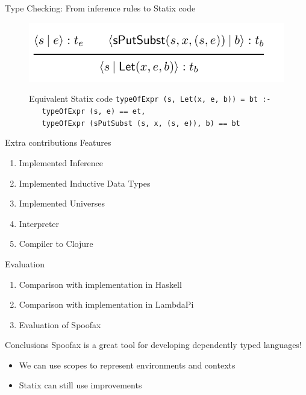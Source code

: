 \documentclass[aspectratio=43]{beamer}
\begin{document}
\begin{frame}[fragile]{Type Checking: From inference rules to Statix code}
\begin{figure}
	\centering
	\includegraphics[width=0.8\linewidth]{img/screenshot004}
\end{figure}

\begin{figure}
	\centering
	\begin{exampleblock}{Equivalent Statix code} 
		\texttt{typeOfExpr (s, Let(x, e, b)) = bt :-\\
			\,\, typeOfExpr (s, e) == et, \\
			\,\, typeOfExpr (sPutSubst (s, x, (s, e)), b) == bt}
	\end{exampleblock}
\end{figure}

\end{frame}

\begin{frame}[fragile]{Extra contributions}
Features
\begin{enumerate}
	\item Implemented Inference
	\item Implemented Inductive Data Types
	\item Implemented Universes
	\item Interpreter
	\item Compiler to Clojure
\end{enumerate}
Evaluation
\begin{enumerate}
	\item Comparison with implementation in Haskell
	\item Comparison with implementation in LambdaPi
	\item Evaluation of Spoofax
\end{enumerate}
\end{frame}

\begin{frame}[fragile]{Conclusions}
	Spoofax is a great tool for developing dependently typed languages!
	\begin{itemize}
		\item We can use scopes to represent environments and contexts
		\item Statix can still use improvements
	\end{itemize}
	
\end{frame}

\end{document}
